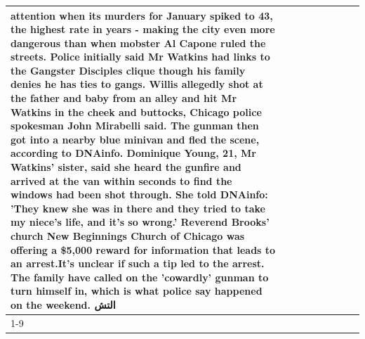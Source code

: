 \begin{table}[H]
\begin{tabular}{lllrlllll}
attention when its murders for January spiked to 43, the highest rate in years - making the city even more dangerous than when mobster Al Capone ruled the streets. Police initially said Mr Watkins had links to the Gangster Disciples clique though his family denies he has ties to gangs. Willis allegedly shot at the father and baby from an alley and hit Mr Watkins in the cheek and buttocks, Chicago police spokesman John Mirabelli said. The gunman then got into a nearby blue minivan and fled the scene, according to DNAinfo. Dominique Young, 21, Mr Watkins' sister, said she heard the gunfire and arrived at the van within seconds to find the windows had been shot through. She told DNAinfo: 'They knew she was in there and they tried to take my niece's life, and it's so wrong.' Reverend Brooks' church New Beginnings Church of Chicago was offering a \$5,000 reward for information that leads to an arrest.It's unclear if such a tip led to the arrest. The family have called on the 'cowardly' gunman to turn himself in, which is what police say happened on the weekend. التش \\
\cline{1-9}

\end{tabular}
\end{table}
